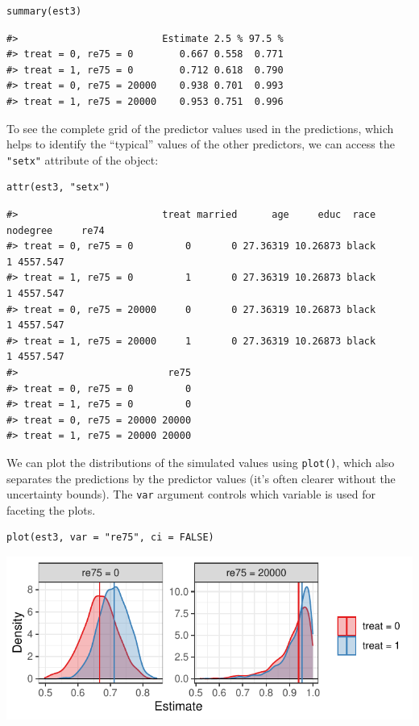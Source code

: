 \begin{verbatim}
summary(est3)
\end{verbatim}

\begin{verbatim}
#>                         Estimate 2.5 % 97.5 %
#> treat = 0, re75 = 0        0.667 0.558  0.771
#> treat = 1, re75 = 0        0.712 0.618  0.790
#> treat = 0, re75 = 20000    0.938 0.701  0.993
#> treat = 1, re75 = 20000    0.953 0.751  0.996
\end{verbatim}

To see the complete grid of the predictor values used in the predictions, which helps to identify the ``typical'' values of the other predictors, we can access the \texttt{"setx"} attribute of the object:

\begin{verbatim}
attr(est3, "setx")
\end{verbatim}

\begin{verbatim}
#>                         treat married      age     educ  race nodegree     re74
#> treat = 0, re75 = 0         0       0 27.36319 10.26873 black        1 4557.547
#> treat = 1, re75 = 0         1       0 27.36319 10.26873 black        1 4557.547
#> treat = 0, re75 = 20000     0       0 27.36319 10.26873 black        1 4557.547
#> treat = 1, re75 = 20000     1       0 27.36319 10.26873 black        1 4557.547
#>                          re75
#> treat = 0, re75 = 0         0
#> treat = 1, re75 = 0         0
#> treat = 0, re75 = 20000 20000
#> treat = 1, re75 = 20000 20000
\end{verbatim}

We can plot the distributions of the simulated values using \texttt{plot()}, which also separates the predictions by the predictor values (it's often clearer without the uncertainty bounds). The \texttt{var} argument controls which variable is used for faceting the plots.

\begin{verbatim}
plot(est3, var = "re75", ci = FALSE)
\end{verbatim}

\begin{center}\includegraphics{figures/unnamed-chunk-14-1} \end{center}


